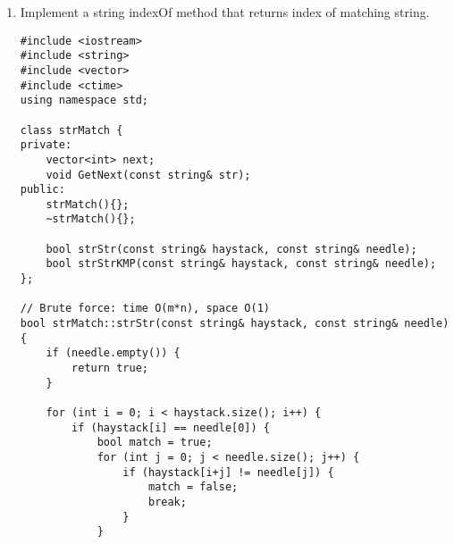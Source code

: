 \documentclass[10pt, onecolumn, draftcls]{IEEEtran}
\begin{document}
\begin{enumerate}
\begin{lstlisting}
  // imput the data into a priority queue
  priority_queue<float> price_new;
  for (int i = 0; i < N; i++) {
    price_new.push(-price[i]);
  }

  // calculate the average of the lowest M days closing price
  float sum = 0;
  for (int i = 0; i < M; i++) {
    sum += (-price_new.top());
    price_new.pop();
  }
  float ave = sum / M;

  cout << ave << endl;
  // return true or false
  return (ave <= P); 
}
// Solution 2: Use sort in c++.
bool ave_lower_P_2(int N, int M, float P, vector<float> price) {

  sort(price.begin(), price.end());

  // calculate the average of the lowest M days closing price
  float sum = 0;
  for (int i = 0; i < M; i++) {
    sum += (price[i]);
  }
  float ave = sum / M;

  cout << ave << endl;
  // return true or false
  return (ave <= P);
}
// Solution 3: Use min heap in c++:
bool ave_lower_P_3(int N, int M, float P, vector<float> price) {

  make_heap(price.begin(), price.end(), std::greater<int>());

  float sum = 0;
  for (int i = 0; i < M; i++) {
    sum += price.front();
    cout << price.front();
    pop_heap(price.begin(), price.end() - 1 - i, std::greater<int>());
    price.pop_back();
  }

  float ave = sum / M;

  cout << ave << endl;
  // return true or false
  return (ave <= P);
}
\end{lstlisting}
\item
Implement a string indexOf method that returns index of matching string.\\
\begin{lstlisting}
#include <iostream>
#include <string>
#include <vector>
#include <ctime>
using namespace std;

class strMatch {
private:
	vector<int> next;
	void GetNext(const string& str);
public:
	strMatch(){};
	~strMatch(){};

	bool strStr(const string& haystack, const string& needle);
	bool strStrKMP(const string& haystack, const string& needle);
};

// Brute force: time O(m*n), space O(1)
bool strMatch::strStr(const string& haystack, const string& needle) {
	if (needle.empty()) {
		return true;
	}

	for (int i = 0; i < haystack.size(); i++) {
		if (haystack[i] == needle[0]) {
			bool match = true;
			for (int j = 0; j < needle.size(); j++) {
				if (haystack[i+j] != needle[j]) {
					match = false;
					break;
				}
			}


\end{lstlisting}
\end{enumerate}
\end{document}
